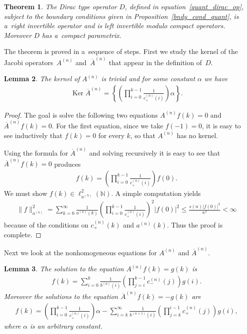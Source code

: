\documentclass[11pt]{article}
\numberwithin{equation}{section}
\newtheorem{theo}{Theorem}[section]
\newtheorem{lem}[theo]{Lemma}
\DeclareMathOperator{\Ker}{Ker}
\begin{document}
\begin{theo}
\label{compact_para_quant}
The Dirac type operator $D$, defined in equation~\eqref{quant_dirac_op}, subject to the boundary conditions given in
Proposition~{\rm \ref{bndy_cond_quant}}, is a~right invertible operator and is left invertible modulo compact operators.
Moreover $D$ has a~compact parametrix.
\end{theo}

The theorem is proved in a~sequence of steps.
First we study the kernel of the Jacobi opera\-tors~${A}^{(n)}$ and~$\overline{A}^{(n)}$ that appear in the def\/inition of~$D$.
\begin{lem}
\label{A_and_A_bar_ker}
The kernel of $A^{(n)}$ is trivial and for some constant $\alpha$ we have
\begin{gather*}
\Ker \overline{A}^{(n)} = \left\{\left(\prod\limits_{i=0}^{k-1}\frac{1}{c_+^{(n)}(i)}\right)\alpha\right\}.
\end{gather*}
\end{lem}

\begin{proof}
The goal is solve the following two equations $A^{(n)}f(k) = 0$ and $\overline{A}^{(n)}f(k)=0$.
For the f\/irst equation, since we take $f(-1)=0$, it is easy to see inductively that $f(k)=0$ for every $k$, so that
$A^{(n)}$ has no kernel.

Using the formula for $\overline{A}^{(n)}$ and solving recursively it is easy to see that $\overline{A}^{(n)}f(k)=0$
produces
\begin{gather*}
f(k) = \left(\prod\limits_{i=0}^{k-1}\frac{1}{c_+^{(n)}(i)}\right)f(0).
\end{gather*}
We must show ${f(k)}\in \ell_{a^{(n)}}^2({\mathbb N})$.
A simple computation yields
\begin{gather*}
\|f\|_{a^{(n)}}^2 = \sum\limits_{k=0}^{\infty}
\frac{1}{a^{(n)}(k)}\left(\prod\limits_{i=0}^{k-1}\frac{1}{c_+^{(n)}(i)}\right)^2|f(0)|^2
\leq\frac{s(n)|f(0)|^2}{\kappa^2} < \infty
\end{gather*}
because of the conditions on $c_+^{(n)}(k)$ and $a^{(n)}(k)$.
Thus the proof is complete.
\end{proof}
Next we look at the nonhomogeneous equations for $A^{(n)}$ and $\overline{A}^{(n)}$.

\begin{lem}
\label{A_and_A_bar_gen_soln}
The solution to the equation $A^{(n)}f(k) = g(k)$ is
\begin{gather*}
f(k) = \sum\limits_{i=0}^k\frac{1}{b^{(n)}(i)}\left(\prod\limits_{j=i}^{k-1}c_-^{(n)}(j)\right)g(i).
\end{gather*}
Moreover the solutions to the equation $\overline{A}^{(n)}f(k) = -g(k)$ are
\begin{gather*}
f(k) = \left(\prod\limits_{i=0}^{k-1}\frac{1}{c_+^{(n)}(i)}\right)\alpha - \sum\limits_{i=k}^\infty
\frac{1}{b^{(n+1)}(i)}\left(\prod\limits_{j=k}^{i-1}c_+^{(n)}(j)\right)g(i),
\end{gather*}
where $\alpha$ is an arbitrary constant.
\end{lem}
\end{document}
